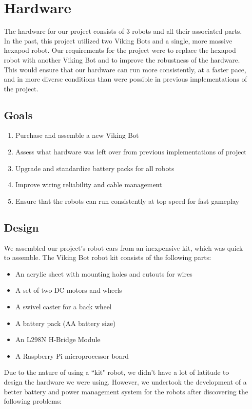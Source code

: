 \documentclass[a4paper,12pt]{article}
\begin{document}
\section{Hardware}
	The hardware for our project consists of 3 robots and all their associated parts. In the past, this project utilized two Viking Bots and a single, more massive hexapod robot. Our requirements for the project were to replace the hexapod robot with another Viking Bot and to improve the robustness of the hardware. This would ensure that our hardware can run more consistently, at a faster pace, and in more diverse conditions than were possible in previous implementations of the project.

\subsection{Goals}
	\begin{enumerate}
		\item Purchase and assemble a new Viking Bot
		\item Assess what hardware was left over from previous implementations of project
		\item Upgrade and standardize battery packs for all robots
		\item Improve wiring reliability and cable management
		\item Ensure that the robots can run consistently at top speed for fast gameplay	
	\end{enumerate}

\subsection{Design}
	We assembled our project’s robot cars from an inexpensive kit, which was quick to assemble.  The Viking Bot robot kit consists of the following parts: 
	\begin{itemize}
		\item An acrylic sheet with mounting holes and cutouts for wires
		\item A set of two DC motors and wheels
		\item A swivel caster for a back wheel
		\item A battery pack (AA battery size)
		\item An L298N H-Bridge Module
		\item A Raspberry Pi microprocessor board
	\end{itemize}

	Due to the nature of using a ``kit" robot, we didn’t have a lot of latitude to design the hardware we were using. However, we undertook the development of a better battery and power management system for the robots after discovering the following problems:
\end{document}
